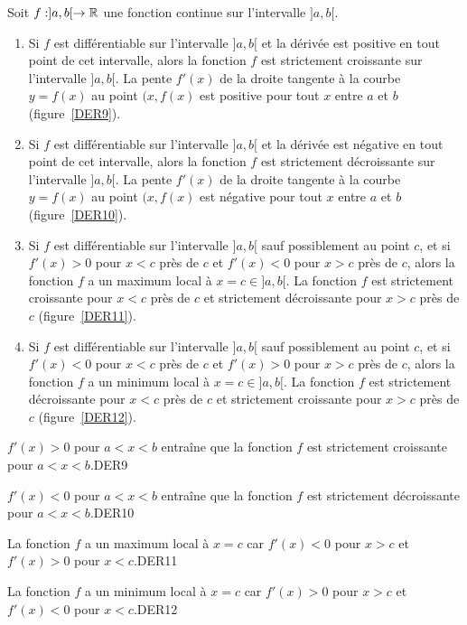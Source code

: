 {\begin{prop}\label{CDDth}
Soit $f:]a,b[\rightarrow \mathbb{R}$ une fonction continue sur l'intervalle
$]a,b[$.
\begin{enumerate}
\item Si $f$ est différentiable sur l'intervalle $]a,b[$ et la dérivée
est positive en tout point de cet intervalle, alors la fonction $f$
est strictement croissante sur l'intervalle $]a,b[$.  La
pente $f'(x)$ de la droite tangente à la courbe $y=f(x)$ au point
$(x,f(x)$ est positive pour tout $x$ entre $a$ et $b$
(figure~\ref{DER9}).
\item Si $f$ est différentiable sur l'intervalle $]a,b[$ et la dérivée
est négative en tout point de cet intervalle, alors la fonction $f$
est strictement décroissante sur l'intervalle $]a,b[$.  La pente
$f'(x)$ de la droite tangente à la courbe $y=f(x)$ au point $(x,f(x)$
est négative pour tout $x$ entre $a$ et $b$ (figure~\ref{DER10}).
\item Si $f$ est différentiable sur l'intervalle $]a,b[$ sauf
possiblement au point $c$, et si $f'(x)>0$ pour $x<c$ près de $c$ et
$f'(x)<0$ pour $x>c$ près de $c$, alors la fonction $f$ a un maximum
local à $x = c\in]a,b[$.  La fonction $f$ est strictement croissante
pour $x<c$ près de $c$ et strictement décroissante pour $x>c$ près de
$c$ (figure~\ref{DER11}).
\item Si $f$ est différentiable sur l'intervalle $]a,b[$ sauf
possiblement au point $c$, et si $f'(x)<0$ pour $x<c$ près de $c$ et
$f'(x)>0$ pour $x>c$ près de $c$, alors la fonction $f$ a un minimum
local à $x = c\in]a,b[$.  La fonction $f$ est strictement
décroissante pour $x<c$ près de $c$ et strictement croissante pour
$x>c$ près de $c$ (figure~\ref{DER12}).
\end{enumerate}
\end{prop}

{$f'(x)>0$ pour $a < x < b$ entraîne que la fonction $f$ est
strictement croissante pour $a<x<b$.}{DER9}

{$f'(x)<0$ pour $a < x < b$ entraîne que la fonction $f$ est
strictement décroissante pour $a<x<b$.}{DER10}

{La fonction $f$ a un maximum local à $x=c$ car $f'(x)<0$ pour $x>c$ et
$f'(x)>0$ pour $x<c$.}{DER11}

{La fonction $f$ a un minimum local à $x=c$ car $f'(x)>0$ pour $x>c$ et
$f'(x)<0$ pour $x<c$.}{DER12}

}
